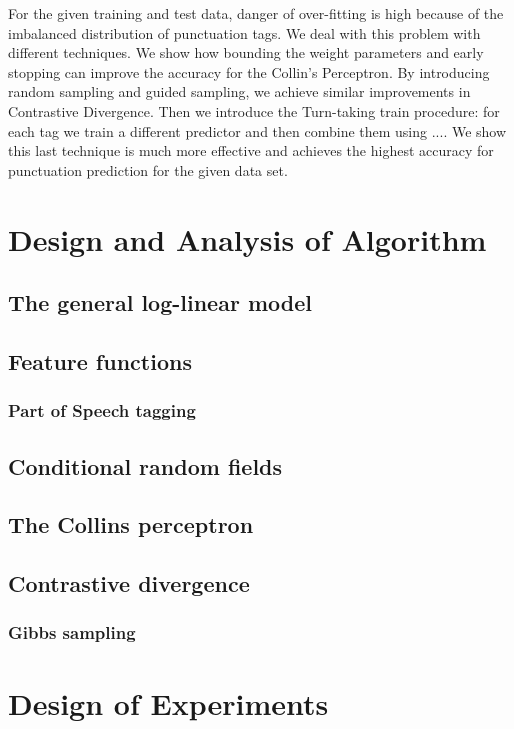\documentclass[twoside,12pt]{article}
\begin{document}
For the given training and test data, danger of over-fitting is high because of the imbalanced distribution of punctuation tags. We deal with this problem with different techniques. We show how bounding the weight parameters and early stopping can improve the accuracy for the Collin's Perceptron. By introducing random sampling and guided sampling, we achieve similar improvements in Contrastive Divergence. Then we introduce the Turn-taking train procedure: for each tag we train a different predictor and then combine them using .... We show this last technique is much more effective and achieves the highest accuracy for punctuation prediction for the given data set.


\section{Design and Analysis of Algorithm}
\subsection{The general log-linear model}
\subsection{Feature functions}
\subsubsection{Part of Speech tagging}
\subsection{Conditional random fields}
\subsection{The Collins perceptron}
\subsection{Contrastive divergence}
\subsubsection{Gibbs sampling}
\section{Design of Experiments}
\end{document}
